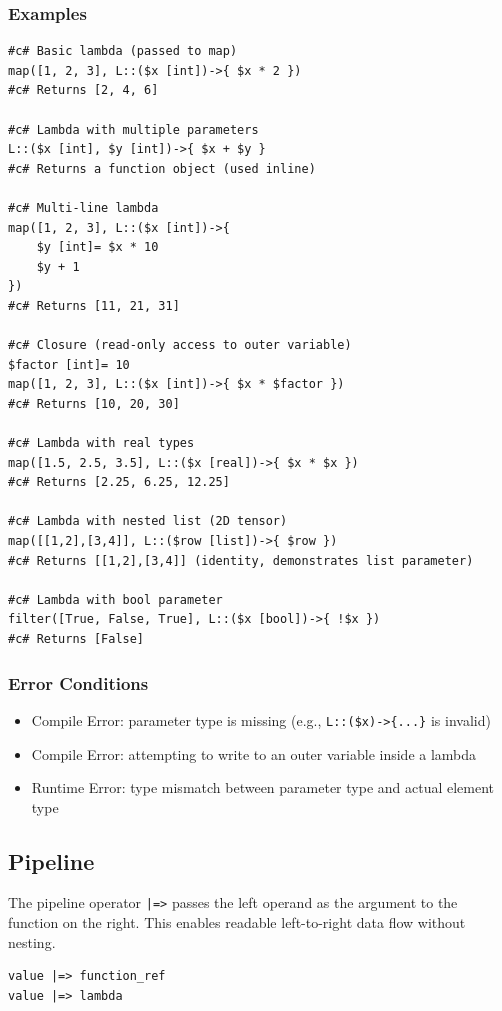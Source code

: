 \subsubsection{Examples}
\begin{verbatim}
#c# Basic lambda (passed to map)
map([1, 2, 3], L::($x [int])->{ $x * 2 })
#c# Returns [2, 4, 6]

#c# Lambda with multiple parameters
L::($x [int], $y [int])->{ $x + $y }
#c# Returns a function object (used inline)

#c# Multi-line lambda
map([1, 2, 3], L::($x [int])->{
    $y [int]= $x * 10
    $y + 1
})
#c# Returns [11, 21, 31]

#c# Closure (read-only access to outer variable)
$factor [int]= 10
map([1, 2, 3], L::($x [int])->{ $x * $factor })
#c# Returns [10, 20, 30]

#c# Lambda with real types
map([1.5, 2.5, 3.5], L::($x [real])->{ $x * $x })
#c# Returns [2.25, 6.25, 12.25]

#c# Lambda with nested list (2D tensor)
map([[1,2],[3,4]], L::($row [list])->{ $row })
#c# Returns [[1,2],[3,4]] (identity, demonstrates list parameter)

#c# Lambda with bool parameter
filter([True, False, True], L::($x [bool])->{ !$x })
#c# Returns [False]
\end{verbatim}

\subsubsection{Error Conditions}
\begin{itemize}
\item Compile Error: parameter type is missing (e.g., \texttt{L::(\$x)->\{...\}} is invalid)
\item Compile Error: attempting to write to an outer variable inside a lambda
\item Runtime Error: type mismatch between parameter type and actual element type
\end{itemize}

\subsection{Pipeline}
The pipeline operator \texttt{|=>} passes the left operand as the argument to the function on the right. This enables readable left-to-right data flow without nesting.
\begin{verbatim}
value |=> function_ref
value |=> lambda
\end{verbatim}

